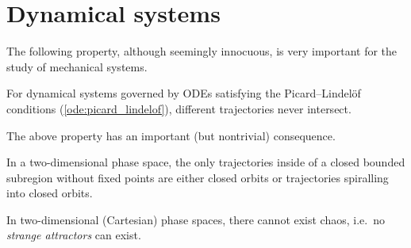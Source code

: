 
\section{Dynamical systems}

    The following property, although seemingly innocuous, is very important for the study of mechanical systems.
    \begin{property}
        For dynamical systems governed by ODEs satisfying the Picard--Lindel\"of conditions (\cref{ode:picard_lindelof}), different trajectories never intersect.
    \end{property}

    The above property has an important (but nontrivial) consequence.
    \begin{theorem}
        In a two-dimensional phase space, the only trajectories inside of a closed bounded subregion without fixed points are either closed orbits or trajectories spiralling into closed orbits.
    \end{theorem}
    \begin{result}
        In two-dimensional (Cartesian) phase spaces, there cannot exist chaos, i.e.~no \textit{strange attractors} can exist.
    \end{result}

